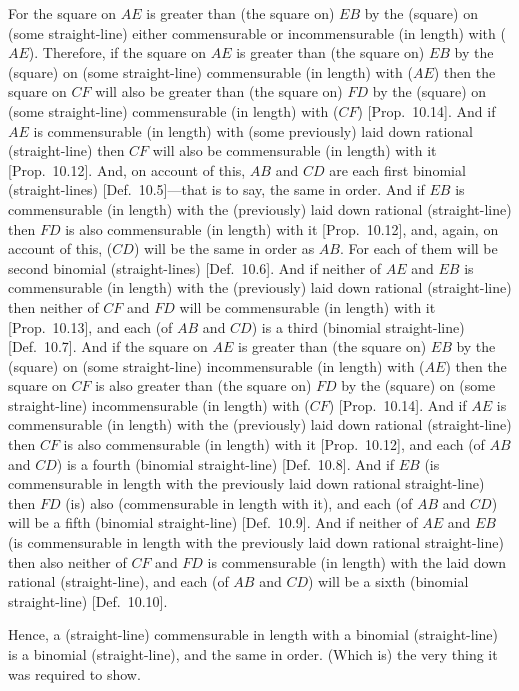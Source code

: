 \begin{Parallel}{}{}
{For the square on $AE$ is  greater than (the square on) $EB$ by the
(square) on (some straight-line) either commensurable or incommensurable
(in length) with ($AE$).  Therefore, if the square on $AE$ is greater than (the square on)
$EB$ by the (square) on (some straight-line) commensurable (in length)
with ($AE$) then the square on $CF$ will also be greater than (the square on)
$FD$ by the (square) on (some straight-line) commensurable (in length)
with ($CF$) [Prop.~10.14]. And if $AE$
is commensurable (in length) with (some previously) laid down rational (straight-line) then $CF$ will also be commensurable (in length) with it [Prop.~10.12]. And, on account of this,
$AB$ and $CD$ are each first binomial (straight-lines) [Def.~10.5]---that is to say, the same  in order.
And if $EB$ is commensurable (in length) with the (previously) laid down
rational (straight-line) then $FD$ is also  commensurable (in length) with it [Prop.~10.12], and, again, on account of this,
($CD$) will be  the same in order as $AB$. For each of them will be second
binomial (straight-lines) [Def.~10.6]. And if neither
of $AE$ and $EB$ is commensurable (in length) with the (previously) laid down
rational (straight-line) then neither of $CF$ and $FD$ will be commensurable (in length)
with it [Prop.~10.13], and each (of $AB$ and $CD$) is a third (binomial straight-line) [Def.~10.7]. And if the square on $AE$
is greater than (the square on) $EB$ by the (square) on (some straight-line)
incommensurable (in length) with ($AE$) then the square on $CF$
is also greater than (the square on) $FD$ by the (square) on (some straight-line) incommensurable (in length) with ($CF$) [Prop.~10.14]. And if $AE$ is commensurable
(in length) with the (previously) laid down rational (straight-line) then $CF$ is also
commensurable (in  length) with it [Prop.~10.12], 
and each (of $AB$ and $CD$) is a fourth (binomial straight-line)
[Def.~10.8]. And
if $EB$ (is commensurable in length with the previously laid down rational
straight-line) then $FD$ (is) also (commensurable in length with it), and
each (of $AB$ and $CD$) will be a fifth (binomial straight-line) [Def.~10.9]. And if neither of $AE$ and  $EB$
(is commensurable in length with the previously laid down rational
straight-line) then also neither of $CF$ and $FD$ is   commensurable (in length) with the laid down rational (straight-line), and
each (of $AB$ and $CD$) will be a sixth (binomial straight-line) [Def.~10.10].

Hence, a (straight-line) commensurable in length with a binomial (straight-line) is a binomial (straight-line), and the same in order. (Which is) the
very thing it was required to show.}
\end{Parallel}

